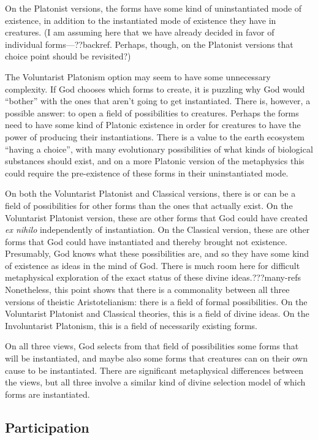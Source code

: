 On the Platonist versions, the forms have some kind of uninstantiated mode of existence, in addition to the instantiated mode of 
existence they have in creatures. (I am assuming here that we have already decided in favor of individual forms---??backref. Perhaps,
though, on the Platonist versions that choice point should be revisited?)

The Voluntarist Platonism option may seem to have some unnecessary complexity. If God chooses which forms to create, it is 
puzzling why God would ``bother'' with the ones that aren't going to get instantiated. There is, however, a possible answer:
to open a field of possibilities to creatures. Perhaps the forms need to have some kind of Platonic existence in order for
creatures to have the power of producing their instantiations. There is a value to the earth ecosystem ``having a choice'', with
many evolutionary possibilities of what kinds of biological substances should exist, and on a more Platonic version of the 
metaphysics this could require the pre-existence of these forms in their uninstantiated mode. 

On both the Voluntarist Platonist and Classical versions, there is or can be a field of possibilities for other forms than 
the ones that actually exist. On the Voluntarist Platonist version, these are other forms that God could have created
\textit{ex nihilo} independently of instantiation.  On the Classical version, these are other forms that God could have 
instantiated and thereby brought not existence. Presumably, God knows what these possibilities are, and so they have some 
kind of existence as ideas in the mind of God. There is much room here for difficult metaphysical exploration of the 
exact status of these divine ideas.???many-refs Nonetheless, this point shows that there is a commonality between all three
versions of theistic Aristotelianism: there is a field of formal possibilities. On the Voluntarist Platonist and Classical
theories, this is a field of divine ideas. On the Involuntarist Platonism, this is a field of necessarily existing forms.

On all three views, God selects from that field of possibilities some forms that will be instantiated, and maybe also some 
forms that creatures can on their own cause to be instantiated. There are significant metaphysical differences between the
views, but all three involve a similar kind of divine selection model of which forms are instantiated.

\subsection{Participation}
